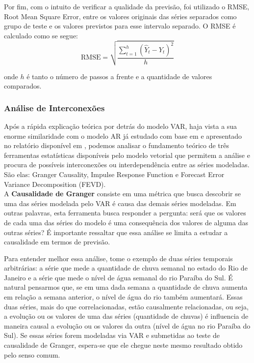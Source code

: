 \documentclass[12pt]{article}
\begin{document}
	Por fim, com o intuito de verificar a qualidade da previsão, foi utilizado o RMSE, \textrm{Root Mean Square Error}, entre os valores originais das séries separados como grupo de teste e os valores previstos para esse intervalo separado. O RMSE é calculado como se segue:
	\begin{equation}\label{eq:RMSE}
		\textrm{RMSE} = \sqrt{\dfrac{\sum_{t=1}^{h}(\hat{Y}_t-Y_t)^2}{h}}
	\end{equation} 
	
	onde $h$ é tanto o número de passos a frente e a quantidade de valores comparados.
	
	\subsubsection{Análise de Interconexões} \label{sec:interconex}
	
	Após a rápida explicação teórica por detrás do modelo VAR, haja vista a sua enorme similaridade com o modelo AR já estudado com base em \cite{Tsay} e apresentado no relatório disponível em \cite{git}, podemos analisar o fundamento teórico de três ferramentas estatísticas disponíveis pelo modelo vetorial que permitem a análise e procura de possíveis interconexões ou interdependência entre as séries modeladas. São elas: \textrm{Granger Causality}, \textrm{Impulse Response Function} e \textrm{Forecast Error Variance Decomposition} (FEVD).\\
	
	A \textbf{Causalidade de Granger} consiste em uma métrica que busca descobrir se uma das séries modelada pelo VAR é causa das demais séries modeladas. Em outras palavras, esta ferramenta busca responder a pergunta: será que os valores de cada uma das séries do modelo é uma consequência dos valores de alguma das outras séries? É importante ressaltar que essa análise se limita a estudar a causalidade em termos de previsão.
	
	Para entender melhor essa análise, tome o exemplo de duas séries temporais arbitrárias: a série que mede a quantidade de chuva semanal no estado do Rio de Janeiro e a série que mede o nível de água semanal do rio Paraíba do Sul. É natural pensarmos que, se em uma dada semana a quantidade de chuva aumenta em relação a semana anterior, o nível de água do rio também aumentará. Essas duas séries, mais do que correlacionadas, estão causalmente relacionadas, ou seja, a evolução ou os valores de uma das séries (quantidade de chuvas) é influencia de maneira causal a evolução ou os valores da outra (nível de água no rio Paraíba do Sul). Se essas séries forem modeladas via VAR e submetidas ao teste de causalidade de Granger, espera-se que ele chegue neste mesmo resultado obtido pelo senso comum.
	
\end{document}
